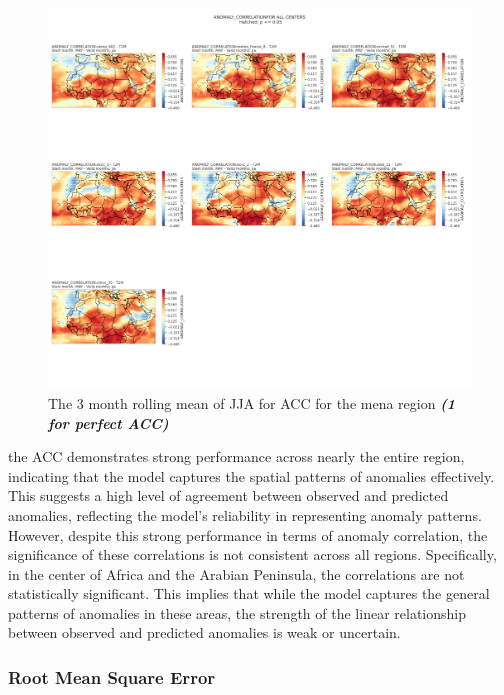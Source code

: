 \begin{figure}[H]
	\centering
	\includegraphics[scale=0.25]{plots/det/acc/ANOMALY_CORRELATION_jja_t2m.png}
	\caption{The 3 month rolling mean of JJA for  ACC for the mena region \textbf{\textit{(1 for perfect ACC)} }}
\end{figure}

the ACC demonstrates strong performance across nearly the entire region, indicating that the model captures the spatial patterns of anomalies effectively. This suggests a high level of agreement between observed and predicted anomalies, reflecting the model's reliability in representing anomaly patterns. However, despite this strong performance in terms of anomaly correlation, the significance of these correlations is not consistent across all regions. Specifically, in the center of Africa and the Arabian Peninsula, the correlations are not statistically significant. This implies that while the model captures the general patterns of anomalies in these areas, the strength of the linear relationship between observed and predicted anomalies is weak or uncertain.
\subsubsection{Root Mean Square Error}


